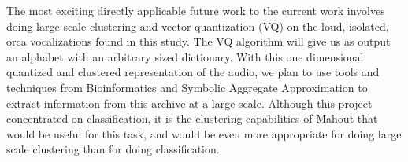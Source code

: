 The most exciting directly applicable future work to the current work
involves doing large scale clustering and vector quantization (VQ) on
the loud, isolated, orca vocalizations found in this study.  The VQ
algorithm will give us as output an alphabet with an arbitrary sized
dictionary.  With this one dimensional quantized and clustered
representation of the audio, we plan to use tools and techniques from
Bioinformatics \cite{sarkar2002} and Symbolic Aggregate Approximation
\cite{lin07} to extract information from this archive at a large scale.
Although this project concentrated on classification, it is the
clustering capabilities of Mahout that would be useful for this task,
and would be even more appropriate for doing large scale clustering
than for doing classification.

